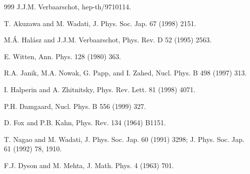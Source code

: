 \begin{thebibliography}{999}
       J.J.M. Verbaarschot,
                      hep-th/9710114.                    %

      T. Akuzawa and M. Wadati,
                      J. Phys. Soc. Jap. 67 (1998) 2151. %

       M.\'A. Hal\'asz and J.J.M. Verbaarschot,
                      Phys. Rev. D 52 (1995) 2563.       %

      E. Witten, 
                      Ann. Phys. 128 (1980) 363.         %

       R.A. Janik, M.A. Nowak, G. Papp, and I. Zahed,
                      Nucl. Phys. B 498 (1997) 313.      %

        I. Halperin and A. Zhitnitsky,
                      Phys. Rev. Lett. 81 (1998) 4071.   %

      P.H. Damgaard,
                      Nucl. Phys. B 556 (1999) 327.      %

       D. Fox and P.B. Kahn, 
                      Phys. Rev. 134 (1964) B1151.       %

       T. Nagao and M. Wadati, 
                      J. Phys. Soc. Jap. 60 (1991) %
                                                   3298;    %
                      J. Phys. Soc. Jap. 61 (1992) 78,      %
                                                   1910.    %

     F.J. Dyson and M. Mehta, 
                      J. Math. Phys. 4 (1963) 701.          %


\end{thebibliography}
